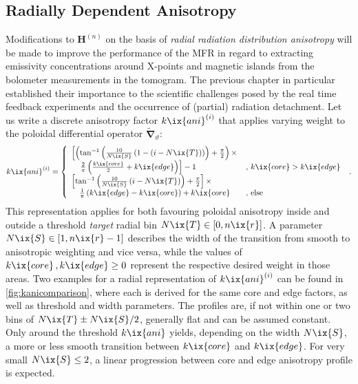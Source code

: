         \subsection{Radially Dependent Anisotropy}\label{subsec:kani}%
%
            Modifications to $\mathbf{H}^{\left(n\right)}$ on the basis of \textit{radial radiation distribution anisotropy} will be made to improve the performance of the MFR in regard to extracting emissivity concentrations around X-points and magnetic islands from the bolometer measurements in the tomogram. The previous chapter in particular established their importance to the scientific challenges posed by the real time feedback experiments and the occurrence of (partial) radiation detachment. Let us write a discrete anisotropy factor $k\ix{ani}^{\left(i\right)}$ that applies varying weight to the poloidal differential operator $\pmb{\widetilde{\nabla}}_{\text{$\vartheta$}}$:
%
            \begin{align}%
                k\ix{ani}^{\left(i\right)}=\left\{\begin{array}{ll}%
                    \left[\left(\tan^{-1}{\left(\frac{10}{N\ix{S}}\left(1-\left(i-N\ix{T}\right)\right)\right)}+\frac{\pi}{2}\right)\times\right.\\%
                    \quad\left.\frac{2}{\pi}\left(\frac{k\ix{core}}{2}+k\ix{edge}\right)\right]-1&,\,k\ix{core}>k\ix{edge}\\%
                    \left[\tan^{-1}{\left(\frac{10}{N\ix{S}}\left(i-N\ix{T}\right)\right)+\frac{\pi}{2}}\right]\times\\%
                    \quad\frac{1}{\pi}\left(k\ix{edge}-k\ix{core}\right)+k\ix{core}&,\,\text{else}%
                \end{array}\right.\,\,.%
            \end{align}\label{eq:kani}%
%
            This representation applies for both favouring poloidal anisotropy inside and outside a threshold \textit{target} radial bin $N\ix{T}\in\left[0,n\ix{r}\right]$. A parameter $N\ix{S}\in\left[1,n\ix{r}-1\right]$ describes the width of the transition from smooth to anisotropic weighting and vice versa, while the values of $k\ix{core}\,,k\ix{edge}\ge0$ represent the respective desired weight in those areas. Two examples for a radial representation of $k\ix{ani}^{\left(i\right)}$ can be found in \cref{fig:kanicomparison}, where each is derived for the same core and edge factors, as well as threshold and width parameters. The profiles are, if not within one or two bins of $N\ix{T}\pm N\ix{S}/2$, generally flat and can be assumed constant. Only around the threshold $k\ix{ani}$ yields, depending on the width $N\ix{S}$, a more or less smooth transition between $k\ix{core}$ and $k\ix{edge}$. For very small $N\ix{S}\le2$, a linear progression between core and edge anisotropy profile is expected.\\%
